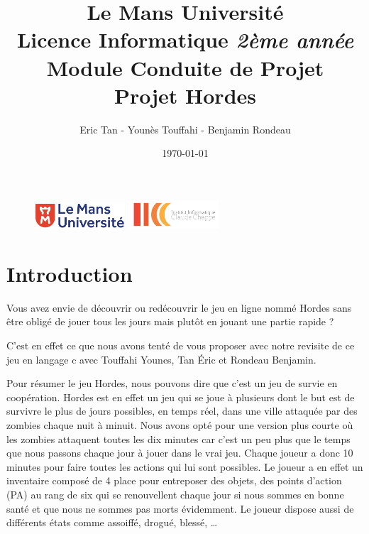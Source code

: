 \documentclass[a4paper,11pt]{article}
\begin{document}
\begin {figure}
\includegraphics[width=0.3\textwidth]{logolemansU.png}
\hspace{150pt}
\includegraphics[width=0.3\textwidth] {logo_ic2.png}
\end {figure}

\title {\textbf {\color {blue} Le Mans Université}\color{black}
\\  Licence Informatique  \textit {2ème année}
\\ Module Conduite de Projet
 \\ \textbf {Projet Hordes}}
\author{Eric Tan - Younès Touffahi - Benjamin Rondeau}
\date{\today}
\maketitle

\newpage

\tableofcontents

\newpage

\section {Introduction}
Vous avez envie de découvrir ou redécouvrir le jeu en ligne nommé Hordes sans être obligé de jouer tous les jours mais plutôt en jouant une partie rapide ?

C’est en effet ce que nous avons tenté de vous proposer avec notre revisite de ce jeu en langage c avec Touffahi Younes, Tan Éric et Rondeau Benjamin.

Pour résumer le jeu Hordes, nous pouvons dire que c’est un jeu de survie en coopération.
Hordes est en effet un jeu qui se joue à plusieurs dont le but est de survivre le plus de jours possibles, en temps réel, dans une ville attaquée par des zombies chaque nuit à minuit. Nous avons opté pour une version plus courte où les zombies attaquent toutes les dix minutes car c’est un peu plus que le temps que nous passons chaque jour à jouer dans le vrai jeu. Chaque joueur a donc 10 minutes pour faire toutes les actions qui lui sont possibles. Le joueur a en effet un inventaire composé de 4 place pour entreposer des objets, des points d’action (PA) au rang de six qui se renouvellent chaque jour si nous sommes en bonne santé et que nous ne sommes pas morts évidemment. Le joueur dispose aussi de différents états comme assoiffé, drogué, blessé, … 
\end{document}
